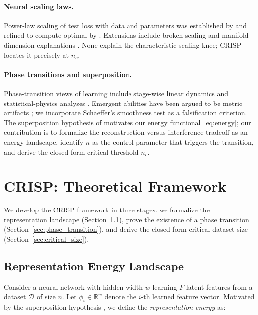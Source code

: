 \documentclass{article}
\newcommand{\nc}{n_c}
\newcommand{\reals}{\mathbb{R}}
\newcommand{\feat}{\phi}
\newcommand{\data}{\mathcal{D}}
\newcommand{\Fnum}{F}
\begin{document}
\paragraph{Neural scaling laws.}
Power-law scaling of test loss with data and parameters was established by \citet{kaplan2020scaling} and refined to compute-optimal by \citet{hoffmann2022training}. Extensions include broken scaling \citep{caballero2023broken} and manifold-dimension explanations \citep{bahri2024explaining}. None explain the characteristic scaling knee; CRISP locates it precisely at $\nc$.

\paragraph{Phase transitions and superposition.}
Phase-transition views of learning include stage-wise linear dynamics \citep{saxe2014exact} and statistical-physics analyses \citep{goldt2020modeling}. Emergent abilities \citep{wei2022emergent} have been argued to be metric artifacts \citep{schaeffer2024emergent}; we incorporate Schaeffer's smoothness test as a falsification criterion. The superposition hypothesis of \citet{elhage2022toy} motivates our energy functional~\eqref{eq:energy}; our contribution is to formalize the reconstruction-versus-interference tradeoff as an energy landscape, identify $n$ as the control parameter that triggers the transition, and derive the closed-form critical threshold $\nc$.


\section{CRISP: Theoretical Framework}
\label{sec:theory}

We develop the CRISP framework in three stages: we formalize the representation landscape (Section~\ref{sec:landscape}), prove the existence of a phase transition (Section~\ref{sec:phase_transition}), and derive the closed-form critical dataset size (Section~\ref{sec:critical_size}).

\subsection{Representation Energy Landscape}
\label{sec:landscape}

Consider a neural network with hidden width $w$ learning $\Fnum$ latent features from a dataset $\data$ of size $n$.
Let $\feat_i \in \reals^w$ denote the $i$-th learned feature vector.
Motivated by the superposition hypothesis \citep{elhage2022toy}, we define the \emph{representation energy} as:
\end{document}
